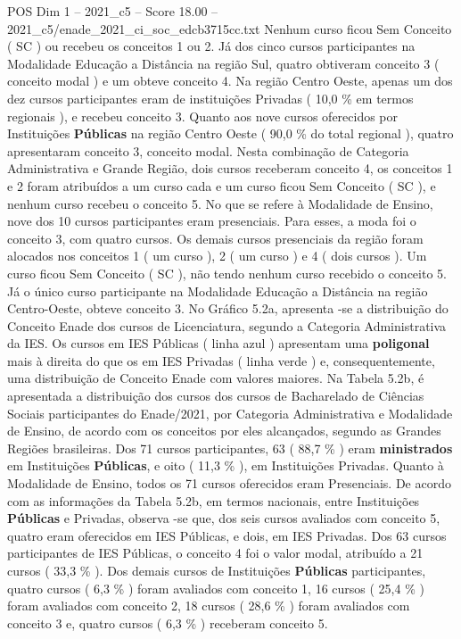 \begin{textsample}{POS Dim 1 – 2021\_c5 – Score 18.00 – 2021\_c5/enade\_2021\_ci\_soc\_edcb3715cc.txt}
Nenhum curso ficou Sem Conceito ( SC ) ou recebeu os conceitos 1 ou 2.
Já dos cinco cursos participantes na Modalidade Educação a Distância na região Sul, quatro obtiveram conceito 3 ( conceito modal ) e um obteve conceito 4.
Na região Centro Oeste, apenas um dos dez cursos participantes eram de instituições Privadas ( 10,0 \% em termos regionais ), e recebeu conceito 3.
Quanto aos nove cursos oferecidos por Instituições \textbf{Públicas} na região Centro Oeste ( 90,0 \% do total regional ), quatro apresentaram conceito 3, conceito modal.
Nesta combinação de Categoria Administrativa e Grande Região, dois cursos receberam conceito 4, os conceitos 1 e 2 foram atribuídos a um curso cada e um curso ficou Sem Conceito ( SC ), e nenhum curso recebeu o conceito 5.
No que se refere à Modalidade de Ensino, nove dos 10 cursos participantes eram presenciais.
Para esses, a moda foi o conceito 3, com quatro cursos.
Os demais cursos presenciais da região foram alocados nos conceitos 1 ( um curso ), 2 ( um curso ) e 4 ( dois cursos ).
Um curso ficou Sem Conceito ( SC ), não tendo nenhum curso recebido o conceito 5.
Já o único curso participante na Modalidade Educação a Distância na região Centro-Oeste, obteve conceito 3.
No Gráfico 5.2a, apresenta -se a distribuição do Conceito Enade dos cursos de Licenciatura, segundo a Categoria Administrativa da IES.
Os cursos em IES Públicas ( linha azul ) apresentam uma \textbf{poligonal} mais à direita do que os em IES Privadas ( linha verde ) e, consequentemente, uma distribuição de Conceito Enade com valores maiores.
Na Tabela 5.2b, é apresentada a distribuição dos cursos dos cursos de Bacharelado de Ciências Sociais participantes do Enade/2021, por Categoria Administrativa e Modalidade de Ensino, de acordo com os conceitos por eles alcançados, segundo as Grandes Regiões brasileiras.
Dos 71 cursos participantes, 63 ( 88,7 \% ) eram \textbf{ministrados} em Instituições \textbf{Públicas}, e oito ( 11,3 \% ), em Instituições Privadas.
Quanto à Modalidade de Ensino, todos os 71 cursos oferecidos eram Presenciais.
De acordo com as informações da Tabela 5.2b, em termos nacionais, entre Instituições \textbf{Públicas} e Privadas, observa -se que, dos seis cursos avaliados com conceito 5, quatro eram oferecidos em IES Públicas, e dois, em IES Privadas.
Dos 63 cursos participantes de IES Públicas, o conceito 4 foi o valor modal, atribuído a 21 cursos ( 33,3 \% ).
Dos demais cursos de Instituições \textbf{Públicas} participantes, quatro cursos ( 6,3 \% ) foram avaliados com conceito 1, 16 cursos ( 25,4 \% ) foram avaliados com conceito 2, 18 cursos ( 28,6 \% ) foram avaliados com conceito 3 e, quatro cursos ( 6,3 \% ) receberam conceito 5.

\end{textsample}
